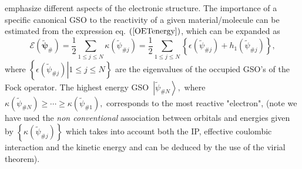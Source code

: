 \documentclass[aps,preprint]{revtex4}%
\begin{document}
emphasize different aspects of the electronic structure. The importance of a
specific canonical GSO to the reactivity of a given material/molecule can be
estimated from the expression eq. $\left(  \ref{OETenergy}\right)  $, which
can be expanded as
\begin{equation}
\mathcal{E}\left(  \boldsymbol{\tilde{\psi}}_{\#}\right)  =\frac{1}{2}%
\sum_{1\leq j\leq N}\kappa\left(  \tilde{\psi}_{\#j}\right)  =\frac{1}{2}%
\sum_{1\leq j\leq N}\left\{  \epsilon\left(  \tilde{\psi}_{\#j}\right)
+h_{1}\left(  \tilde{\psi}_{\#j}\right)  \right\}  , \label{FockEn}%
\end{equation}
where $\left\{  \left.  \epsilon\left(  \tilde{\psi}_{\#j}\right)  \right\vert
1\leq j\leq N\right\}  $ are the eigenvalues of the occupied GSO's of the Fock
operator. The highest energy GSO\ $\left\vert \tilde{\psi}_{\#N}\right\rangle
,$ where $\kappa\left(  \tilde{\psi}_{\#N}\right)  \geq\cdots\geq\kappa\left(
\tilde{\psi}_{\#1}\right)  ,$ corresponds to the most reactive "electron",
(note we have used the \emph{non conventional} association between orbitals
and energies given by $\left\{  \kappa\left(  \tilde{\psi}_{\#j}\right)
\right\}  $ which takes into account both the IP, effective coulombic
interaction and the kinetic energy and can be deduced by the use of the virial theorem).
\end{document}
